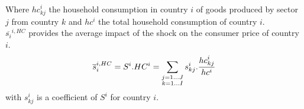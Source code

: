 \documentclass[11pt,a4paper]{article}
\begin{document}
Where ${hc}_{kj}^i$ the household consumption in country $i$ of goods produced by sector $j$ from country $k$ and $hc^i$ the total household consumption of country $i$. \\
$\overline{s_{i}}^{i,HC}$ provides the average impact of the shock on the consumer price of country $i$. 
 \begin{eqnarray}
\overline{s}_{i}^{i,HC}=S^i.HC^i=\underset{\begin{subarray}{c}j=1\dots J \\ k=1 \dots I \end{subarray}}{\mathop \sum}\,{{s}_{kj}^i}.\frac{{hc}_{kj}^i}{hc^i}
\label{eq:eq6}
 \end{eqnarray} 
with ${s}_{kj}^i$ is a coefficient of $S^i$ for country $i$. 
\end{document}
